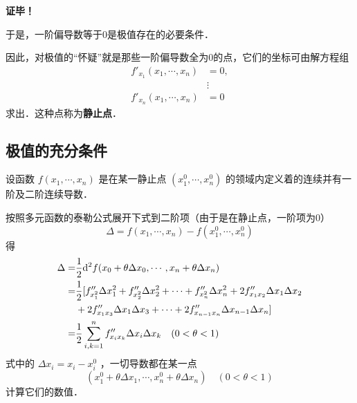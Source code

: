\textbf{证毕！}

于是，一阶偏导数等于0是极值存在的必要条件．

因此，对极值的“怀疑”就是那些一阶偏导数全为0的点，它们的坐标可由解方程组
\begin{equation}
\begin{aligned}
f'_{x_1}(x_1,\cdots,x_n)&=0,\\
&\vdots\\
f'_{x_n}(x_1,\cdots,x_n)&=0
\end{aligned}
\end{equation}
求出．这种点称为\textbf{静止点}．
\subsection{极值的充分条件}
设函数 $f(x_1,\cdots,x_n)$ 是在某一静止点 $(x_1^0,\cdots,x_n^0)$ 的领域内定义着的连续并有一阶及二阶连续导数．
\begin{issues}
\end{issues}
按照多元函数的泰勒公式展开下式到二阶项（由于是在静止点，一阶项为0）
\begin{equation}
\Delta=f(x_1,\cdots,x_n)-f(x_1^0,\cdots,x_n^0)
\end{equation}
得
\begin{equation}
\begin{aligned}
\Delta=&\frac{1}{2}\mathrm{d}^2 f(x_0+\theta\Delta x_0,\cdots,x_n+\theta\Delta x_n)\\
=&\frac{1}{2}[f''_{x_1^2}\Delta x_1^2+f''_{x_2^2}\Delta x_2^2+\cdots+f''_{x_n^2}\Delta x_n^2+2f''_{x_1x_2}\Delta x_1\Delta x_2\\
&+2f''_{x_1x_3}\Delta x_1\Delta x_3+\cdots+2f''_{x_{n-1}x_n}\Delta x_{n-1}\Delta x_n\large]
 \\
 =&\frac{1}{2}\sum_{i,k=1}^nf''_{x_ix_k}\Delta x_i\Delta x_k \quad (0<\theta<1)
\end{aligned}
\end{equation}
式中的 $\Delta x_i=x_i-x_i^0$ ，一切导数都在某一点
\begin{equation}
(x_1^0+\theta\Delta x_1,\cdots,x_n^0+\theta\Delta x_n) \quad (0<\theta<1)
\end{equation}
计算它们的数值．